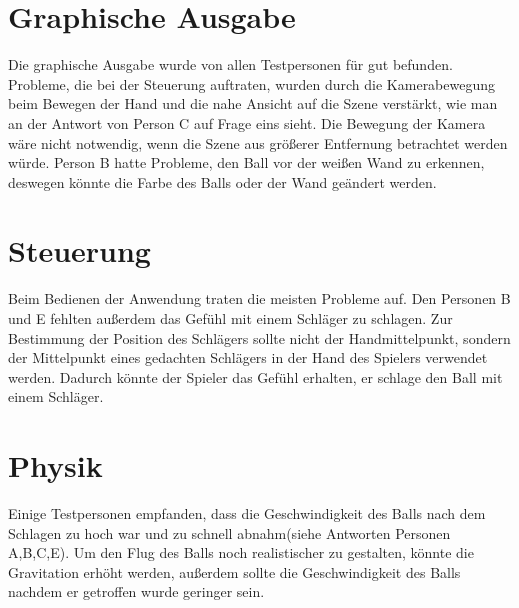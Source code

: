 \section{Graphische Ausgabe}
\label{Kapitel_5_-_Unterkapitel_1}
Die graphische Ausgabe wurde von allen Testpersonen für gut befunden. Probleme, die bei der Steuerung auftraten,  wurden durch die Kamerabewegung beim Bewegen der Hand und die nahe Ansicht auf die Szene verstärkt, wie man an der Antwort von Person C auf Frage eins sieht. Die Bewegung der Kamera wäre nicht notwendig, wenn die Szene aus größerer Entfernung betrachtet werden würde. Person B hatte Probleme, den Ball vor der weißen Wand zu erkennen, deswegen könnte die Farbe des Balls oder der Wand geändert werden.
\section{Steuerung}
\label{Kapitel_5_-_Unterkapitel_2}
Beim Bedienen der Anwendung traten  die meisten Probleme auf. Den Personen B und E fehlten außerdem das Gefühl mit einem Schläger zu schlagen. Zur Bestimmung der Position des Schlägers sollte nicht der Handmittelpunkt, sondern der Mittelpunkt eines gedachten Schlägers in der Hand des Spielers verwendet werden. Dadurch könnte der Spieler das Gefühl erhalten, er schlage den Ball mit einem Schläger.
\section{Physik}
\label{Kapitel_5_-_Unterkapitel_3}
Einige Testpersonen empfanden, dass die Geschwindigkeit des Balls nach dem Schlagen zu hoch war und zu schnell abnahm(siehe Antworten Personen A,B,C,E). Um den Flug des Balls noch realistischer zu gestalten, könnte die Gravitation erhöht werden, außerdem sollte die Geschwindigkeit des Balls nachdem er getroffen wurde geringer sein.